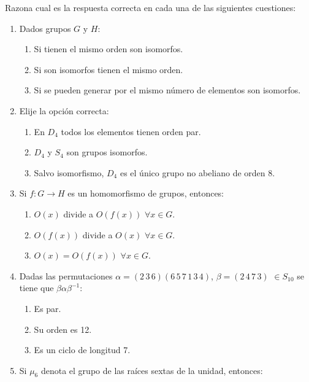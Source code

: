 \documentclass[12pt]{article}
\begin{document}
    \begin{ejercicio}
        Razona cual es la respuesta correcta en cada una de las siguientes cuestiones:
        \begin{enumerate}
            \item Dados grupos $G$ y $H$:
            \begin{enumerate}
                \item Si tienen el mismo orden son isomorfos.
                \item Si son isomorfos tienen el mismo orden.
                \item Si se pueden generar por el mismo número de elementos son isomorfos.
            \end{enumerate}
            \item Elije la opción correcta:
            \begin{enumerate}
                \item En $D_4$ todos los elementos tienen orden par.
                \item $D_4$ y $S_4$ son grupos isomorfos.
                \item Salvo isomorfismo, $D_4$ es el único grupo no abeliano de orden 8.
            \end{enumerate}
            \item Si $f : G \to H$ es un homomorfismo de grupos, entonces:
            \begin{enumerate}
                \item $O(x)$ divide a $O(f(x))$ $\forall x \in G$.
                \item $O(f(x))$ divide a $O(x)$ $\forall x \in G$.
                \item $O(x) = O(f(x))$ $\forall x \in G$.
            \end{enumerate}
            \item Dadas las permutaciones $\alpha = (2\,3\,6)(6\,5\,7\,1\,3\,4)$, $\beta = (2\,4\,7\,3)$ $\in S_{10}$ se tiene que $\beta\alpha\beta^{-1}$:
            \begin{enumerate}
                \item Es par.
                \item Su orden es 12.
                \item Es un ciclo de longitud 7.
            \end{enumerate}
            \item Si $\mu_6$ denota el grupo de las raíces sextas de la unidad, entonces:
            \begin{enumerate}

\end{enumerate}
\end{enumerate}
\end{ejercicio}
\end{document}
